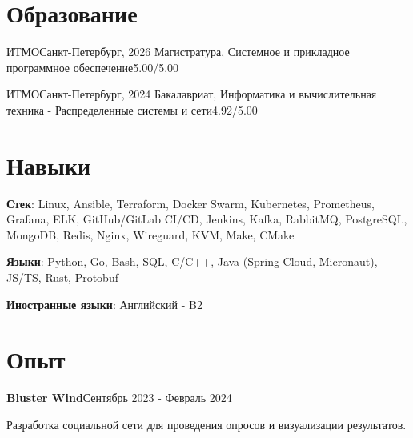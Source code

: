 \documentclass[letterpaper,11pt]{article}
\begin{document}
\section{Образование}
\resumeSubHeadingListStart
  \resumeSubheading
    {ИТМО}{Санкт-Петербург, 2026}
    {Магистратура, Системное и прикладное программное обеспечение}{5.00/5.00}

  \resumeSubheading
    {ИТМО}{Санкт-Петербург, 2024}
    {Бакалавриат, Информатика и вычислительная техника - Распределенные системы и сети}{4.92/5.00}

\resumeSubHeadingListEnd

\section{Навыки}
\resumeSubHeadingListStart
  \small{\item{
    \textbf{Стек}{: Linux, Ansible, Terraform, Docker Swarm, Kubernetes, Prometheus, Grafana, ELK, GitHub/GitLab CI/CD, Jenkins, Kafka, RabbitMQ, PostgreSQL, MongoDB, Redis, Nginx, Wireguard, KVM, Make, CMake }

   \textbf{Языки}{: Python, Go, Bash, SQL, C/C++, Java (Spring Cloud, Micronaut), JS/TS, Rust, Protobuf }

   \textbf{Иностранные языки}{: Английский - B2}%
  }}
\resumeSubHeadingListEnd

\section{Опыт}
\resumeSubHeadingListStart
  \resumeExperienceHeading
    {\textbf{Bluster Wind}}{Сентябрь 2023 - Февраль 2024}

    {\vspace{-10pt}\small Разработка социальной сети для проведения опросов и визуализации результатов.\vspace{-7pt}}

  \resumeItemListStart
  \resumeItemListEnd
\resumeSubHeadingListEnd
\end{document}
